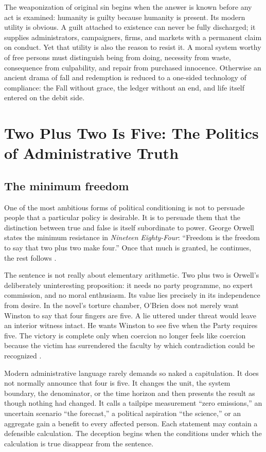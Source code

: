 ﻿\documentclass[12pt,a4paper]{book}
\begin{document}
The weaponization of original sin begins when the answer is known before any
act is examined: humanity is guilty because humanity is present.  Its modern
utility is obvious.  A guilt attached to existence can never be fully
discharged; it supplies administrators, campaigners, firms, and markets with a
permanent claim on conduct.  Yet that utility is also the reason to resist it.
A moral system worthy of free persons must distinguish being from doing,
necessity from waste, consequence from culpability, and repair from purchased
innocence.  Otherwise an ancient drama of fall and redemption is reduced to a
one-sided technology of compliance: the Fall without grace, the ledger without
an end, and life itself entered on the debit side.


\chapter[Two Plus Two Is Five]{Two Plus Two Is Five: The Politics of Administrative Truth}
\label{chap:two-plus-two-five}

\section{The minimum freedom}

One of the most ambitious forms of political conditioning is not to persuade
people that a particular policy is desirable.  It is to persuade them that the
distinction between true and false is itself subordinate to power.  George
Orwell states the minimum resistance in \emph{Nineteen Eighty-Four}: ``Freedom
is the freedom to say that two plus two make four.''  Once that much is
granted, he continues, the rest follows \cite[Part~I, chap.~7]{Orwell-1984}.

The sentence is not really about elementary arithmetic.  Two plus two is
Orwell's deliberately uninteresting proposition: it needs no party programme,
no expert commission, and no moral enthusiasm.  Its value lies precisely in
its independence from desire.  In the novel's torture chamber, O'Brien does
not merely want Winston to say that four fingers are five.  A lie uttered under
threat would leave an interior witness intact.  He wants Winston to see five
when the Party requires five.  The victory is complete only when coercion no
longer feels like coercion because the victim has surrendered the faculty by
which contradiction could be recognized \cite[Part~III, chap.~2]{Orwell-1984}.

Modern administrative language rarely demands so naked a capitulation.  It
does not normally announce that four is five.  It changes the unit, the system
boundary, the denominator, or the time horizon and then presents the result as
though nothing had changed.  It calls a tailpipe measurement ``zero
emissions,'' an uncertain scenario ``the forecast,'' a political aspiration
``the science,'' or an aggregate gain a benefit to every affected person.
Each statement may contain a defensible calculation.  The deception begins
when the conditions under which the calculation is true disappear from the
sentence.
\end{document}
